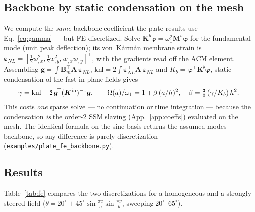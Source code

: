 \subsection{Backbone by static condensation on the mesh}
We compute the \emph{same} backbone coefficient the plate results use ---
Eq.~\eqref{eq:gamma} --- but FE-discretized. Solve $\bm K^b\bm\varphi=\omega_1^2\bm M^b\bm\varphi$
for the fundamental mode (unit peak deflection); its von~K\'arm\'an membrane strain is
$\bm\varepsilon_{NL}=[\tfrac12 w_{,x}^2,\tfrac12 w_{,y}^2,w_{,x}w_{,y}]^{\!\top}$, with the
gradients read off the ACM element. Assembling
$\bm g=\!\int\bm B_m^{\!\top}\bm A\,\bm\varepsilon_{NL}$,
$\mathrm{knl}=2\!\int\bm\varepsilon_{NL}^{\!\top}\bm A\,\bm\varepsilon_{NL}$ and
$K_b=\bm\varphi^{\!\top}\bm K^b\bm\varphi$, static condensation of the fast in-plane fields gives
\begin{equation}
\gamma=\mathrm{knl}-2\,\bm g^{\!\top}(\bm K^{\mathrm{in}})^{-1}\bm g,
\qquad
\Omega(a)/\omega_1=1+\beta\,(a/h)^2,\quad \beta=\tfrac38\,(\gamma/K_b)\,h^2 .
\end{equation}
This costs \emph{one} sparse solve --- no continuation or time integration --- because the
condensation \emph{is} the order-2 SSM slaving (App.~\ref{app:coeffs}) evaluated on the mesh.
The identical formula on the sine basis returns the assumed-modes backbone, so any difference
is purely discretization (\texttt{examples/plate\_fe\_backbone.py}).

\subsection{Results}
Table~\ref{tab:fe} compares the two discretizations for a homogeneous and a strongly steered
field ($\theta=20^\circ+45^\circ\sin\tfrac{\pi x}{a}\sin\tfrac{\pi y}{b}$, sweeping
$20^\circ$--$65^\circ$).

\begin{table}[t]
\centering\footnotesize
{}
\caption{Assumed-modes vs.\ FE backbone (parenthesized: detuning error vs.\ FE). ``$N$
modes'' is the number of transverse modes in total (the $N$ lowest), with $3\times3$
in-plane modes; the design evaluator uses 64 transverse ($m,n\le8$) and $6\times6$ in-plane
modes (Table~\ref{tab:conv}). This test therefore checks the transverse discretization
and the nonlinear FE model on a smooth steered field ($20^\circ$--$65^\circ$); the in-plane
resolution of the actual design is checked separately by the FE evaluation of the
optimized field (ratio $\nFEratio$, Sec.~\ref{sec:confirm}). Homogeneous:
the two agree to $\nFEtabUDagree\%$, validating the FE nonlinear model. Strong steering: the frequency is a
slowly-converging Ritz upper bound ($+\nFEtabFreqErrEight\%$ at $8$ modes, $+\nFEtabFreqErrTwentyFour\%$ at $24$), but the
\emph{normalized detuning} --- the design quantity --- matches FE to $\nFEtabDetErrEight\%$ at $8$ modes and
$\nFEtabDetErrTwentyFour\%$ at $24$.}
\label{tab:fe}
\end{table}

